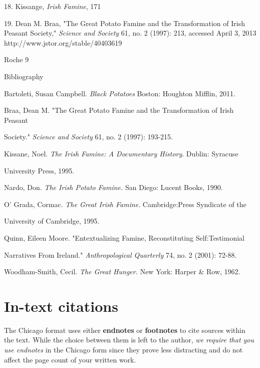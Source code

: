 \begin{Spacing}{1.5}
\hspace{.4in}18. Kissange, \emph{Irish Famine}, 171

\hspace{.4in}19. Dean M. Braa, "The Great Potato Famine and the Transformation of Irish Peasant Society," \emph{Science and Society} 61, no. 2 (1997): 213, accessed April 3, 2013 http://www.jstor.org/stable/40403619


\newpage

\thispagestyle{empty}
\begin{flushright}Roche 9\end{flushright}
\begin{center}Bibliography\end{center}

Bartoleti, Susan Campbell. \emph{Black Potatoes} Boston: Houghton Mifflin, 2011.

Braa, Dean M. "The Great Potato Famine and the Transformation of Irish Peasant 

\hspace{.4in}Society." \emph{Science and Society} 61, no. 2 (1997): 193-215.

Kissane, Noel. \emph{The Irish Famine: A Documentary History}. Dublin: Syracuse 

\hspace{.4in}University Press, 1995.

Nardo, Don. \emph{The Irish Potato Famine.} San Diego: Lucent Books, 1990.

O' Grada, Cormac. \emph{The Great Irish Famine}. Cambridge:Press Syndicate of the 

\hspace{.4in} University of Cambridge, 1995.

Quinn, Eileen Moore. "Entextualizing Famine, Reconstituting Self:Testimonial 

\hspace{.4in}Narratives From Ireland." \emph{Anthropological Quarterly} 74, no. 2 (2001): 72-88.

Woodham-Smith, Cecil.  \emph{The Great Hunger.} New York: Harper \& Row, 1962.


\end{Spacing}

\newpage



\section {In-text citations}
The Chicago format uses either \textbf{endnotes} or \textbf{footnotes} to cite sources 
within the text. While the choice between them is left to the author, 
\emph{we require that you use endnotes} in the Chicago form since they prove less 
distracting and do not affect the page count of your written work. 

